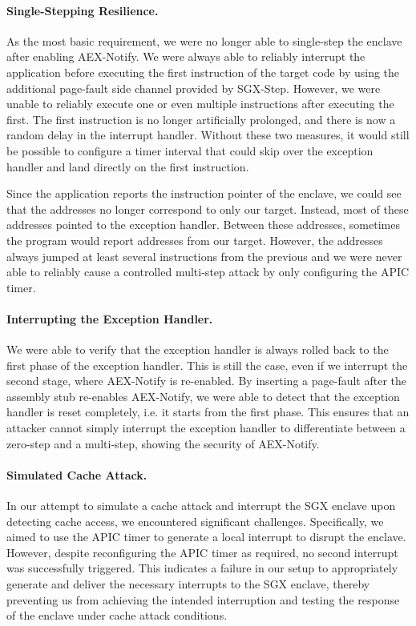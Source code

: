 \documentclass{llncs}
\begin{document}
\paragraph{Single-Stepping Resilience.}
As the most basic requirement,
we were no longer able to single-step the enclave after enabling AEX-Notify.
We were always able to reliably interrupt the application
before executing the first instruction of the target code
by using the additional page-fault side channel provided by SGX-Step.
However, we were unable to reliably execute one or
even multiple instructions after executing the first.
The first instruction is no longer artificially prolonged,
and there is now a random delay in the interrupt handler.
Without these two measures,
it would still be possible to configure a timer interval
that could skip over the exception handler and land directly on the first instruction.

Since the application reports the instruction pointer of the enclave,
we could see that the addresses no longer correspond to only our target.
Instead, most of these addresses pointed to the exception handler.
Between these addresses, sometimes the program would report addresses from our target.
However, the addresses always jumped at least several instructions from the previous
and we were never able to reliably cause a controlled multi-step attack
by only configuring the APIC timer.

\paragraph{Interrupting the Exception Handler.}
We were able to verify that the exception handler is always rolled back to the
first phase of the exception handler.
This is still the case, even if we interrupt the second stage, where AEX-Notify
is re-enabled.
By inserting a page-fault after the assembly stub re-enables AEX-Notify, we
were able to detect that the exception handler is reset completely, i.e. it
starts from the first phase.
This ensures that an attacker cannot simply interrupt the exception handler
to differentiate between a zero-step and a multi-step,
showing the security of AEX-Notify.

\paragraph{Simulated Cache Attack.}
In our attempt to simulate a cache attack and interrupt the SGX enclave upon
detecting cache access, we encountered significant challenges.
Specifically, we aimed to use the APIC timer to generate a local interrupt to
disrupt the enclave.
However, despite reconfiguring the APIC timer as required, no second interrupt
was successfully triggered.
This indicates a failure in our setup to appropriately generate and deliver the
necessary interrupts to the SGX enclave, thereby preventing us from achieving
the intended interruption and testing the response of the enclave under cache
attack conditions.
\end{document}

